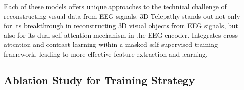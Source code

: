 \documentclass[conference]{IEEEtran}
\begin{document}
Each of these models offers unique approaches to the technical challenge of reconstructing visual data from EEG signals. 3D-Telepathy stands out not only for its breakthrough in reconstructing 3D visual objects from EEG signals, but also for its dual self-attention mechanism in the EEG encoder. Integrates cross-attention and contrast learning within a masked self-supervised training framework, leading to more effective feature extraction and learning.


\subsection{Ablation Study for Training Strategy}


\end{document}
